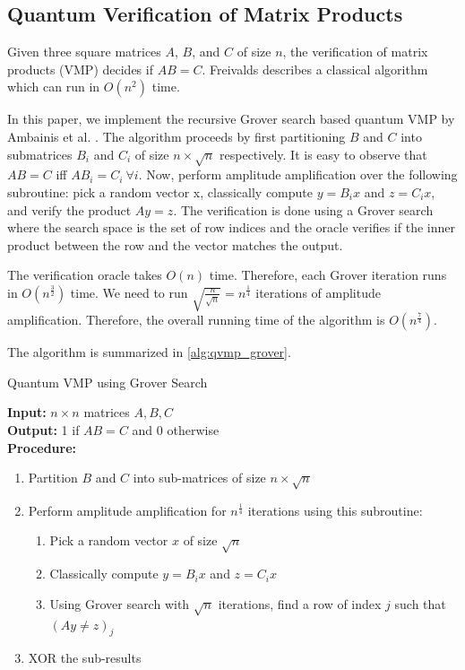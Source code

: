 \documentclass[11pt]{article}
\theoremstyle{definition}
\theoremstyle{remark}
\begin{document}
\subsection{Quantum Verification of Matrix Products}

Given three square matrices $A$, $B$, and $C$ of size $n$, the verification of
matrix products (VMP) decides if $AB = C$. Freivalds describes a classical
algorithm which can run in $O(n^2)$ time.

In this paper, we implement the recursive Grover search based quantum VMP by
Ambainis et al. \cite{ambainis_quantum_2002}. The algorithm proceeds by first
partitioning $B$ and $C$ into submatrices $B_i$ and $C_i$ of size $n \times
\sqrt{n}$ respectively. It is easy to observe that $AB = C$ iff $AB_i = C_i \
\forall i$. Now, perform amplitude amplification over the following subroutine:
pick a random vector x, classically compute $y = B_ix$ and $z = C_ix$, and
verify the product $Ay = z$. The verification is done using a Grover search
where the search space is the set of row indices and the oracle verifies if the
inner product between the row and the vector matches the output.

The verification oracle takes $O(n)$ time. Therefore, each Grover iteration
runs in $O(n^{\frac{3}{2}})$ time. We need to run $\sqrt{\frac{n}{\sqrt{n}}} =
n^{\frac{1}{4}}$ iterations of amplitude amplification. Therefore, the overall
running time of the algorithm is $O(n^{\frac{7}{4}})$.

The algorithm is summarized in \cref{alg:qvmp_grover}.

\begin{algorithm}
  \caption{Quantum VMP using Grover Search \cite{j_quantum_2020}}
  \label{alg:qvmp_grover}
  \textbf{Input: } $n \times n$ matrices $A, B, C$ \\
  \textbf{Output: } 1 if $AB = C$ and 0 otherwise \\
  \textbf{Procedure: }
  \begin{enumerate}
    \item Partition $B$ and $C$ into sub-matrices of size $n \times \sqrt{n}$
    \item 
      {
        Perform amplitude amplification for $n^{\frac{1}{4}}$ iterations using this subroutine:
        \begin{enumerate}
          \item Pick a random vector $x$ of size $\sqrt{n}$
          \item Classically compute $y = B_ix$ and $z = C_ix$
          \item Using Grover search with $\sqrt{n}$ iterations, find a row of
            index $j$ such that $(Ay \neq z)_j$
        \end{enumerate}
      }
    \item XOR the sub-results
  \end{enumerate}
\end{algorithm}
\end{document}
